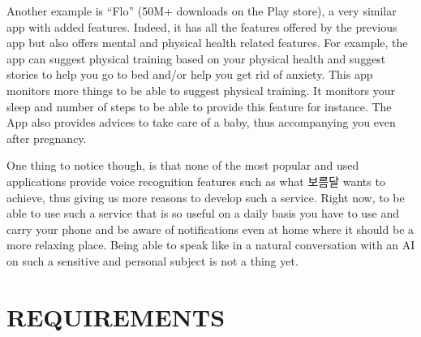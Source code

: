 \documentclass[conference]{IEEEtran}
\begin{document}
Another example is “Flo” (50M+ downloads on the Play store), a very similar app with added features. Indeed, it has all the features offered by the previous app but also offers mental and physical health related features. For example, the app can suggest physical training based on your physical health and suggest stories to help you go to bed and/or help you get rid of anxiety. This app monitors more things to be able to suggest physical training. It monitors your sleep and number of steps to be able to provide this feature for instance. The App also provides advices to take care of a baby, thus accompanying you even after pregnancy.

One thing to notice though, is that none of the most popular and used applications provide voice recognition features such as what 보름달 wants to achieve, thus giving us more reasons to develop such a service. Right now, to be able to use such a service that is so useful on a daily basis you have to use and carry your phone and be aware of notifications even at home where it should be a more relaxing place. Being able to speak like in a natural conversation with an AI on such a sensitive and personal subject is not a thing yet.


\section{REQUIREMENTS}
\end{document}
